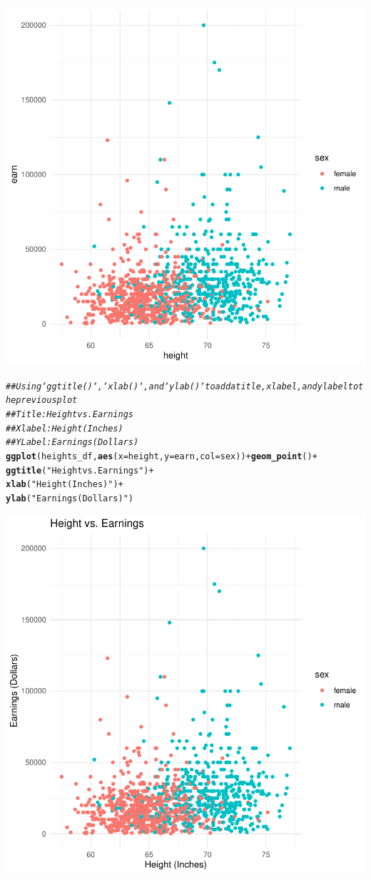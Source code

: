 \documentclass{article}\usepackage[]{graphicx}\usepackage[]{xcolor}
\makeatletter
\newcommand{\hlstr}[1]{\textcolor[rgb]{0.192,0.494,0.8}{#1}}%
\newcommand{\hlcom}[1]{\textcolor[rgb]{0.678,0.584,0.686}{\textit{#1}}}%
\newcommand{\hlopt}[1]{\textcolor[rgb]{0,0,0}{#1}}%
\newcommand{\hlstd}[1]{\textcolor[rgb]{0.345,0.345,0.345}{#1}}%
\newcommand{\hlkwc}[1]{\textcolor[rgb]{0.333,0.667,0.333}{#1}}%
\newcommand{\hlkwd}[1]{\textcolor[rgb]{0.737,0.353,0.396}{\textbf{#1}}}%
\newenvironment{kframe}{%
 \def\at@end@of@kframe{}%
 \ifinner\ifhmode%
  \def\at@end@of@kframe{\end{minipage}}%
  \begin{minipage}{\columnwidth}%
 \fi\fi%
 \def\FrameCommand##1{\hskip\@totalleftmargin \hskip-\fboxsep
 \colorbox{shadecolor}{##1}\hskip-\fboxsep
     \hskip-\linewidth \hskip-\@totalleftmargin \hskip\columnwidth}%
 \MakeFramed {\advance\hsize-\width
   \@totalleftmargin\z@ \linewidth\hsize
   \@setminipage}}%
 {\par\unskip\endMakeFramed%
 \at@end@of@kframe}
\newenvironment{knitrout}{}{} %
\makeatother
\begin{document}
\begin{knitrout}
{\centering \includegraphics[width=.6\linewidth]{figure/assignment-03-Quintero-Vasquez-Johnatan-Rnwauto-report-7} 

}


\begin{kframe}\begin{alltt}
\hlcom{## Using `ggtitle()`, `xlab()`, and `ylab()` to add a title, x label, and y label to the previous plot}
\hlcom{## Title: Height vs. Earnings}
\hlcom{## X label: Height (Inches)}
\hlcom{## Y Label: Earnings (Dollars)}
\hlkwd{ggplot}\hlstd{(heights_df,} \hlkwd{aes}\hlstd{(}\hlkwc{x} \hlstd{= height,} \hlkwc{y} \hlstd{= earn,} \hlkwc{col}\hlstd{=sex))} \hlopt{+} \hlkwd{geom_point}\hlstd{()} \hlopt{+}
  \hlkwd{ggtitle}\hlstd{(}\hlstr{"Height vs. Earnings"}\hlstd{)} \hlopt{+}
  \hlkwd{xlab}\hlstd{(}\hlstr{"Height (Inches)"}\hlstd{)} \hlopt{+}
  \hlkwd{ylab}\hlstd{(}\hlstr{"Earnings (Dollars)"}\hlstd{)}
\end{alltt}
\end{kframe}

{\centering \includegraphics[width=.6\linewidth]{figure/assignment-03-Quintero-Vasquez-Johnatan-Rnwauto-report-8} 

}
\end{knitrout}
\end{document}
